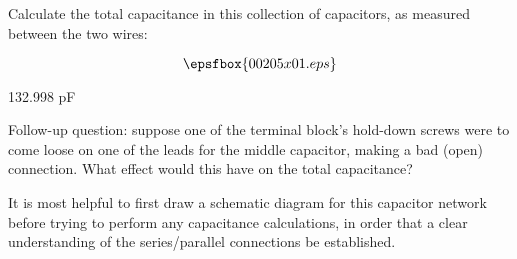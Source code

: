 

Calculate the total capacitance in this collection of capacitors, as measured between the two wires:

$$\epsfbox{00205x01.eps}$$







132.998 pF

\vskip 10pt

Follow-up question: suppose one of the terminal block's hold-down screws were to come loose on one of the leads for the middle capacitor, making a bad (open) connection.  What effect would this have on the total capacitance?







It is most helpful to first draw a schematic diagram for this capacitor network before trying to perform any capacitance calculations, in order that a clear understanding of the series/parallel connections be established.




